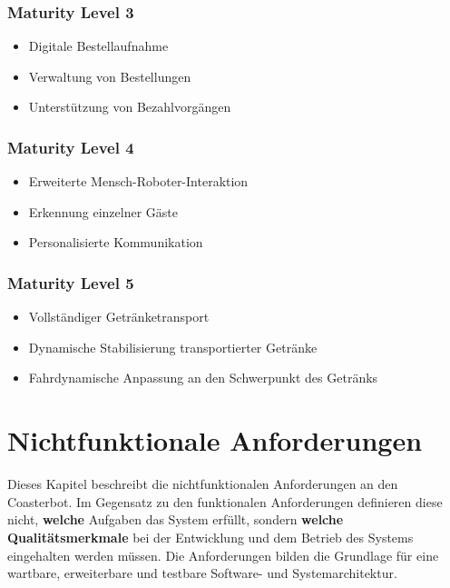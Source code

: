 \documentclass[
  a4paper,
  12pt,
  DIV=12,        %
  parskip=half,  %
  headings=small %
]{scrartcl}
\theoremstyle{definition}
\providecommand{\tightlist}{%
  \setlength{\itemsep}{0pt}\setlength{\parskip}{0pt}}
\theoremstyle{definition}
\begin{document}
\subsubsection{Maturity Level 3}\label{maturity-level-3}

\begin{itemize}
\tightlist
\item
  Digitale Bestellaufnahme
\item
  Verwaltung von Bestellungen
\item
  Unterstützung von Bezahlvorgängen
\end{itemize}

\subsubsection{Maturity Level 4}\label{maturity-level-4}

\begin{itemize}
\tightlist
\item
  Erweiterte Mensch-Roboter-Interaktion
\item
  Erkennung einzelner Gäste
\item
  Personalisierte Kommunikation
\end{itemize}

\subsubsection{Maturity Level 5}\label{maturity-level-5}

\begin{itemize}
\tightlist
\item
  Vollständiger Getränketransport
\item
  Dynamische Stabilisierung transportierter Getränke
\item
  Fahrdynamische Anpassung an den Schwerpunkt des Getränks
\end{itemize}

\section{Nichtfunktionale
Anforderungen}\label{nichtfunktionale-anforderungen}

Dieses Kapitel beschreibt die nichtfunktionalen Anforderungen an den
Coasterbot. Im Gegensatz zu den funktionalen Anforderungen definieren
diese nicht, \textbf{welche} Aufgaben das System erfüllt, sondern
\textbf{welche Qualitätsmerkmale} bei der Entwicklung und dem Betrieb
des Systems eingehalten werden müssen. Die Anforderungen bilden die
Grundlage für eine wartbare, erweiterbare und testbare Software- und
Systemarchitektur.
\end{document}
